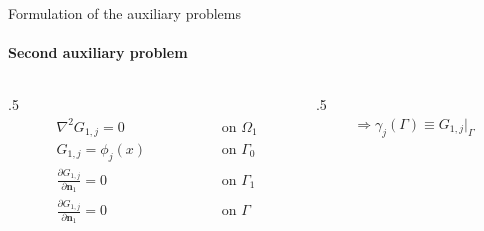 \documentclass{beamer}
\begin{document}
\begin{frame}{Formulation of the auxiliary problems}
	\framesubtitle{Second auxiliary problem}
	\begin{columns}
	\begin{column}{.5\textwidth}
	\begin{subequations}
		\begin{alignat*}{2}
		& \nabla^2 G_{1,j} = 0 \quad\quad\quad\quad\quad && \text{ on } \Omega_1  \\ 
		& G_{1,j} = \phi_j(x) && \text{ on } \Gamma_0  \\
		& \frac{\partial G_{1,j}}{\partial \mathbf{n}_1} = 0 && \text{ on }  \Gamma_1  \\ 
		& \frac{\partial G_{1,j}}{\partial\mathbf{n}_1} = 0 \quad\quad\quad\quad\quad && \text{ on }  \Gamma 
		\end{alignat*}
	\end{subequations}
	\end{column}

	\begin{column}{.5\textwidth}
		\begin{align*}
		\Rightarrow \gamma_j(\Gamma) \equiv G_{1,j}\big|_\Gamma
	\end{align*}
	\end{column}
	\end{columns}

	\begin{center}
	\end{center}
\end{frame}
\end{document}
